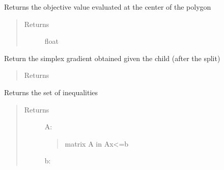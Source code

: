 \documentclass[letterpaper,10pt,english]{sphinxmanual}
\begin{document}
\begin{fulllineitems}
\begin{fulllineitems}
\begin{quote}
\begin{description}
\end{description}\end{quote}

\end{fulllineitems}



\begin{fulllineitems}
Returns the objective value evaluated at the center of the polygon
\begin{quote}\begin{description}
\item[{Returns}] \leavevmode
float

\end{description}\end{quote}

\end{fulllineitems}



\begin{fulllineitems}
Return the simplex gradient obtained given the child (after
the split)
\begin{quote}\begin{description}
\item[{Returns}] \leavevmode
\href{http://docs.scipy.org/doc/numpy/reference/generated/numpy.ndarray.html\#numpy.ndarray}{}

\end{description}\end{quote}

\end{fulllineitems}



\begin{fulllineitems}
Returns the set of inequalities
\begin{quote}\begin{description}
\item[{Returns}] \leavevmode
A: \href{http://docs.scipy.org/doc/numpy/reference/generated/numpy.ndarray.html\#numpy.ndarray}{}
\begin{quote}

matrix A in Ax\textless{}=b
\end{quote}

b: \href{http://docs.scipy.org/doc/numpy/reference/generated/numpy.ndarray.html\#numpy.ndarray}{}
\begin{quote}


\end{quote}
\end{description}
\end{quote}
\end{fulllineitems}
\end{fulllineitems}
\end{document}
